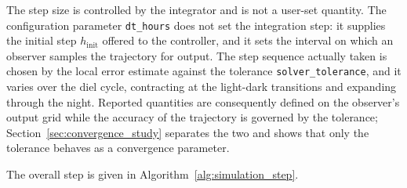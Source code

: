 \documentclass[a4paper,fleqn]{cas-sc}
\begin{document}
The step size is controlled by the integrator and is not a user-set
quantity. The configuration parameter \texttt{dt\_hours} does not set the
integration step: it supplies the initial step $h_{\text{init}}$ offered to
the controller, and it sets the interval on which an observer samples the
trajectory for output. The step sequence actually taken is chosen by the
local error estimate against the tolerance \texttt{solver\_tolerance}, and it
varies over the diel cycle, contracting at the light-dark transitions and
expanding through the night. Reported quantities are consequently defined on
the observer's output grid while the accuracy of the trajectory is governed
by the tolerance; Section~\ref{sec:convergence_study} separates the two and
shows that only the tolerance behaves as a convergence parameter.

The overall step is given in Algorithm~\ref{alg:simulation_step}.
\end{document}
